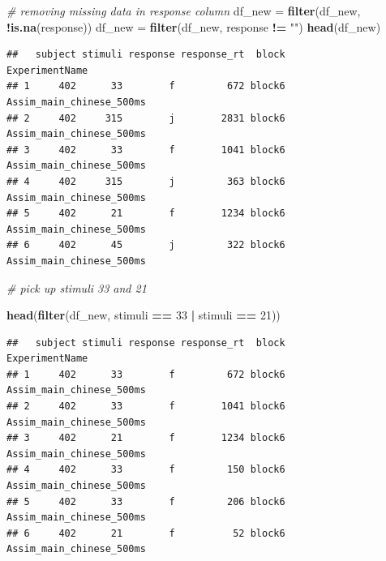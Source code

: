 \documentclass[]{book}
\newenvironment{Shaded}{\begin{snugshade}}{\end{snugshade}}
\newcommand{\KeywordTok}[1]{\textcolor[rgb]{0.13,0.29,0.53}{\textbf{#1}}}
\newcommand{\DecValTok}[1]{\textcolor[rgb]{0.00,0.00,0.81}{#1}}
\newcommand{\StringTok}[1]{\textcolor[rgb]{0.31,0.60,0.02}{#1}}
\newcommand{\CommentTok}[1]{\textcolor[rgb]{0.56,0.35,0.01}{\textit{#1}}}
\newcommand{\OperatorTok}[1]{\textcolor[rgb]{0.81,0.36,0.00}{\textbf{#1}}}
\newcommand{\NormalTok}[1]{#1}
\begin{document}
\begin{Shaded}
\begin{Highlighting}[]
\CommentTok{# removing missing data in response column}
\NormalTok{df_new =}\StringTok{ }\KeywordTok{filter}\NormalTok{(df_new, }\OperatorTok{!}\KeywordTok{is.na}\NormalTok{(response))}
\NormalTok{df_new =}\StringTok{ }\KeywordTok{filter}\NormalTok{(df_new, response }\OperatorTok{!=}\StringTok{ ""}\NormalTok{)}
\KeywordTok{head}\NormalTok{(df_new)}
\end{Highlighting}
\end{Shaded}

\begin{verbatim}
##   subject stimuli response response_rt  block           ExperimentName
## 1     402      33        f         672 block6 Assim_main_chinese_500ms
## 2     402     315        j        2831 block6 Assim_main_chinese_500ms
## 3     402      33        f        1041 block6 Assim_main_chinese_500ms
## 4     402     315        j         363 block6 Assim_main_chinese_500ms
## 5     402      21        f        1234 block6 Assim_main_chinese_500ms
## 6     402      45        j         322 block6 Assim_main_chinese_500ms
\end{verbatim}

\begin{Shaded}
\begin{Highlighting}[]
\CommentTok{# pick up stimuli 33 and 21}

\KeywordTok{head}\NormalTok{(}\KeywordTok{filter}\NormalTok{(df_new, stimuli }\OperatorTok{==}\StringTok{ }\DecValTok{33} \OperatorTok{|}\StringTok{ }\NormalTok{stimuli }\OperatorTok{==}\StringTok{ }\DecValTok{21}\NormalTok{))}
\end{Highlighting}
\end{Shaded}

\begin{verbatim}
##   subject stimuli response response_rt  block           ExperimentName
## 1     402      33        f         672 block6 Assim_main_chinese_500ms
## 2     402      33        f        1041 block6 Assim_main_chinese_500ms
## 3     402      21        f        1234 block6 Assim_main_chinese_500ms
## 4     402      33        f         150 block6 Assim_main_chinese_500ms
## 5     402      33        f         206 block6 Assim_main_chinese_500ms
## 6     402      21        f          52 block6 Assim_main_chinese_500ms
\end{verbatim}

\begin{Shaded}
\end{Shaded}
\end{document}
